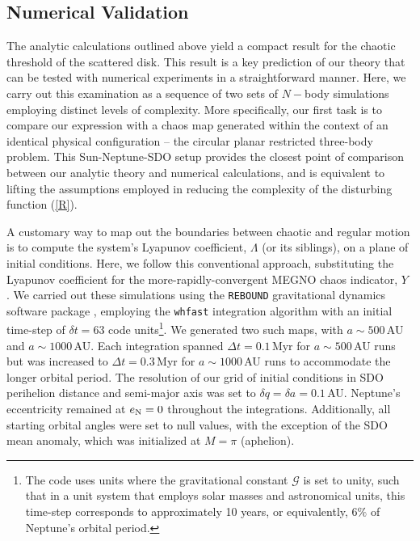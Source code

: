 \documentclass[twocolumn]{aastex62}
\newcommand{\G}{\mathcal{G}}
\begin{document}
\subsection{Numerical Validation}  \label{sec:numsim}
The analytic calculations outlined above yield a compact result for the chaotic threshold of the scattered disk. This result is a key prediction of our theory that can be tested with numerical experiments in a straightforward manner. Here, we carry out this examination as a sequence of two sets of $N-$body simulations employing distinct levels of complexity. More specifically, our first task is to compare our expression with a chaos map generated within the context of an identical physical configuration -- the circular planar restricted three-body problem. This Sun-Neptune-SDO setup provides the closest point of comparison between our analytic theory and numerical calculations, and is equivalent to lifting the assumptions employed in reducing the complexity of the disturbing function (\ref{R}).


A customary way to map out the boundaries between chaotic and regular motion is to compute the system's Lyapunov coefficient, $\Lambda$ (or its siblings), on a plane of initial conditions. Here, we follow this conventional approach, substituting the Lyapunov coefficient for the more-rapidly-convergent MEGNO chaos indicator, $Y$ \citep{MEGNO}. We carried out these simulations using the \texttt{REBOUND} gravitational dynamics software package \citep{2019MNRAS.485.5490R,2019MNRAS.489.4632R}, employing the \texttt{whfast} integration algorithm with an initial time-step of $\delta t=63$ code units\footnote{The code uses units where the gravitational constant $\G$ is set to unity, such that in a unit system that employs solar masses and astronomical units, this time-step corresponds to approximately 10 years, or equivalently, $6\%$ of Neptune's orbital period.}. We generated two such maps, with $a\sim500\,$AU and $a\sim1000\,$AU. Each integration spanned $\Delta t = 0.1\,$Myr for $a\sim500\,$AU runs but was increased to $\Delta t = 0.3\,$Myr for $a\sim1000\,$AU runs to accommodate the longer orbital period. The resolution of our grid of initial conditions in SDO perihelion distance and semi-major axis was set to $\delta q = \delta a = 0.1\,$AU. Neptune's eccentricity remained at $e_{\rm{N}}=0$ throughout the integrations. Additionally, all starting orbital angles were set to null values, with the exception of the SDO mean anomaly, which was initialized at $M=\pi$ (aphelion). 
\end{document}
